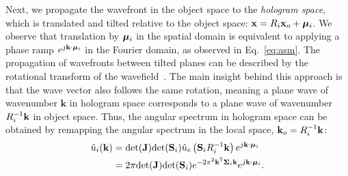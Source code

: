 Next, we propagate the wavefront in the object space to the \textit{hologram space}, which is translated and tilted relative to the object space: $\mathbf{x} = R_i \mathbf{x}_o + {\bm{\mu}}_i$. We observe that translation by ${\bm{\mu}}_i$ in the spatial domain is equivalent to applying a phase ramp $e^{j\mathbf{k} \cdot {\bm{\mu}}_i}$ in the Fourier domain, as observed in Eq.~\ref{eq:asm}. The propagation of wavefronts between tilted planes can be described by the rotational transform of the wavefield~\cite{matsushima2003fast}. The main insight behind this approach is that the wave vector also follows the same rotation, meaning a plane wave of wavenumber $\mathbf{k}$ in hologram space corresponds to a plane wave of wavenumber $R_i^{-1}\mathbf{k}$ in object space. Thus, the angular spectrum in hologram space can be obtained by remapping the angular spectrum in the local space, $\mathbf{k}_o = R_i^{-1} \mathbf{k}$:%
\begin{align}
    \angularspectrum_i(\mathbf{k}) &=  \textrm{det}( \mathbf{J}) \textrm{det}(\mathbf{S}_\idx) \angularspectrum_\canonicalspace \left(\mathbf{S}_\idx \rot_\idx^{-1}\mathbf{k} \right) e^{j  \mathbf{k}\cdot \mean_\idx} \label{eq:gaussian_to_hologram_new} \\
    &= 2 \pi \textrm{det}( \mathbf{J}) \textrm{det}(\mathbf{S}_\idx)  e^{-2\pi^2 \mathbf{k}^\mathsf{T} \cov_i \mathbf{k}}e^{j  \mathbf{k}\cdot \mean_\idx} \label{eq:exactgws} . %
\end{align} %
